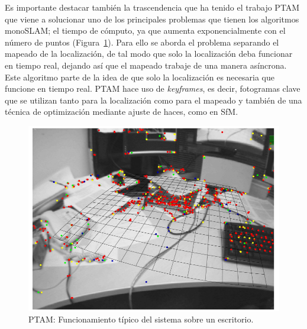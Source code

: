 Es importante destacar también la trascendencia que ha tenido el trabajo PTAM \parencite{Reference6} que viene a solucionar uno de los principales problemas que tienen los algoritmos monoSLAM; el tiempo de cómputo, ya que aumenta exponencialmente con el número de puntos (Figura~\ref{fig:Ptam}). Para ello se aborda el problema separando el mapeado de la localización, de tal modo que solo la localización deba funcionar en tiempo real, dejando así que el mapeado trabaje de una manera asíncrona. Este algoritmo parte de la idea de que solo la localización es necesaria que funcione en tiempo real. PTAM hace uso de \textit{keyframes}, es decir, fotogramas clave que se utilizan tanto para la localización como para el mapeado y también de una técnica de optimización mediante ajuste de haces, como en SfM.

\begin{figure}[th]
\centering
\includegraphics[scale=0.4]{Figures/ptam.png}
\decoRule
\caption[Ptam]{PTAM: Funcionamiento típico del sistema sobre un escritorio.}
\label{fig:Ptam}
\end{figure}

